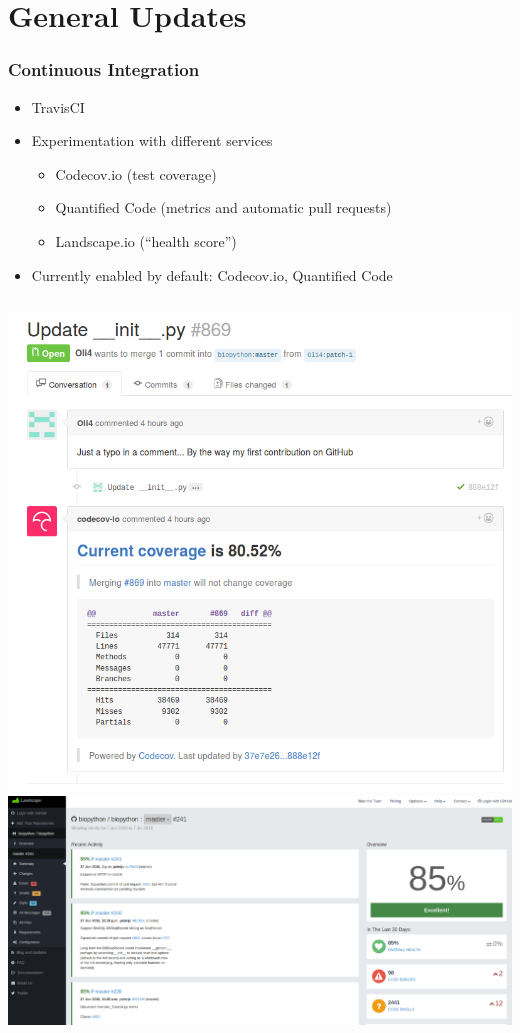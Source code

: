 \documentclass[trans]{beamer}
\begin{document}
\section{General Updates}
\frame
{
  \frametitle{Continuous Integration}

  \begin{itemize}
  \item TravisCI
  \item Experimentation with different services
  \begin{itemize}
  \item Codecov.io (test coverage)
  \item Quantified Code (metrics and automatic pull requests)
  \item Landscape.io (``health score'')
  \end{itemize}
  \item Currently enabled by default: Codecov.io, Quantified Code
  \end{itemize}

  \begin{columns}
  \includegraphics[width=1\textwidth]{bp-codecov.png}
  \includegraphics[width=1\textwidth]{bp-landscape.png}
  \end{columns}
}
\end{document}
